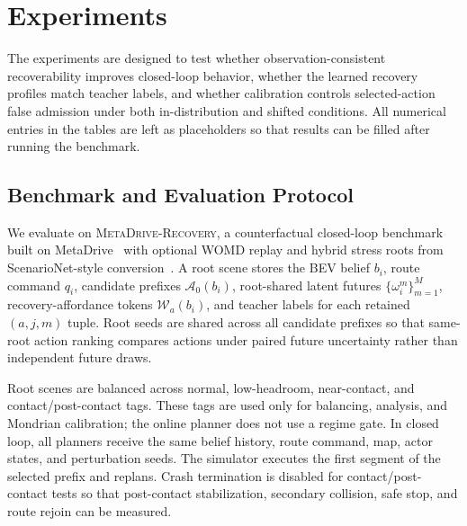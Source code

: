 \documentclass[conference]{IEEEtran}
\begin{document}
\section{Experiments}
\label{sec:experiments}

The experiments are designed to test whether observation-consistent recoverability improves closed-loop behavior, whether the learned recovery profiles match teacher labels, and whether calibration controls selected-action false admission under both in-distribution and shifted conditions.  All numerical entries in the tables are left as placeholders so that results can be filled after running the benchmark.

\subsection{Benchmark and Evaluation Protocol}
\label{subsec:benchmark_protocol}

We evaluate on \textsc{MetaDrive-Recovery}, a counterfactual closed-loop benchmark built on MetaDrive~\cite{li2022metadrive} with optional WOMD replay and hybrid stress roots from ScenarioNet-style conversion~\cite{ettinger2021large,li2023scenarionet}.  A root scene stores the BEV belief $b_i$, route command $q_i$, candidate prefixes $\mathcal A_0(b_i)$, root-shared latent futures $\{\omega_i^m\}_{m=1}^M$, recovery-affordance tokens $\mathcal W_a(b_i)$, and teacher labels for each retained $(a,j,m)$ tuple.  Root seeds are shared across all candidate prefixes so that same-root action ranking compares actions under paired future uncertainty rather than independent future draws.

Root scenes are balanced across normal, low-headroom, near-contact, and contact/post-contact tags.  These tags are used only for balancing, analysis, and Mondrian calibration; the online planner does not use a regime gate.  In closed loop, all planners receive the same belief history, route command, map, actor states, and perturbation seeds.  The simulator executes the first segment of the selected prefix and replans.  Crash termination is disabled for contact/post-contact tests so that post-contact stabilization, secondary collision, safe stop, and route rejoin can be measured.
\end{document}
